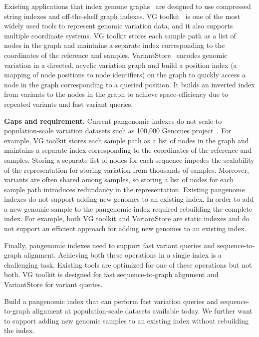 Existing applications that index genome graphs~\cite{pandey2021variantstore,garrison2018variation} are designed to use compressed string indexes and off-the-shelf graph indexes. VG toolkit~\cite{garrison2018variation} is one of the most widely used tools to represent genomic variation data, and it also supports multiple coordinate systems. VG toolkit stores each sample path as a list of nodes in the graph and maintains a separate index corresponding to the coordinates of the reference and samples. 
%
VariantStore~\cite{pandey2021variantstore}  encodes genomic variation in a directed, acyclic variation graph and build a position index (a mapping of node positions to node identifiers) on the graph to quickly access a node in the graph corresponding to a queried position. It builds an inverted index from variants to the nodes in the graph to achieve space-efficiency due to repeated variants and fast variant queries.

\noindent
{\bf Gaps and requirement.}
Current pangenomic indexes do not scale to population-scale variation datasets such as 100,000 Genomes project~\cite{1002021100}. For example, VG toolkit stores each sample path as a list of nodes in the graph and maintains a separate index corresponding to the coordinates of the reference and samples. Storing a separate list of nodes for each sequence impedes the scalability of the representation for storing variation from thousands of samples. Moreover, variants are often shared among samples, so storing a list of nodes for each sample path introduces redundancy in the representation. 
%
Existing pangenome indexes do not support adding new genomes to an existing index. In order to add a new genomic sample to the pangenomic index required rebuilding the complete index. For example, both VG toolkit and VariantStore are static indexes and do not support an efficient approach for adding new genomes to an existing index.

Finally, pangenomic indexes need to support fast variant queries and sequence-to-graph alignment. Achieving both these operations in a single index is a challenging task. Existing tools are optimized for one of these operations but not both. VG toolkit is designed for fast sequence-to-graph alignment and VariantStore for variant queries.


\begin{rproblem}
 Build a pangenomic index that can perform fast variation queries and sequence-to-graph alignment at population-scale datasets available today. We further want to support adding new genomic samples to an existing index without rebuilding the index.
\label{rprob:peppermint3}
\end{rproblem}

